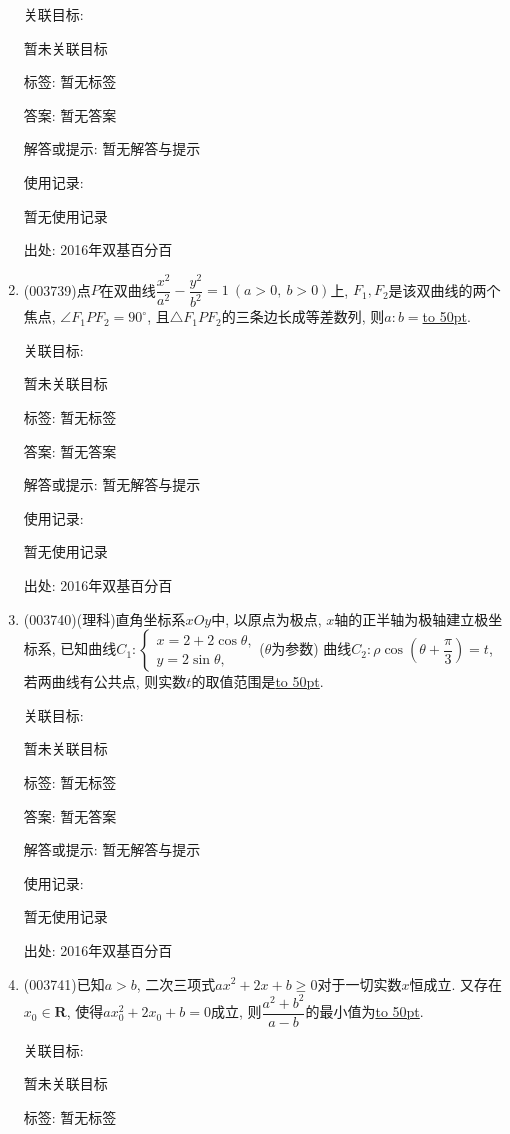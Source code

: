 \documentclass[10pt,a4paper]{article}
\newcommand{\blank}[1]{\underline{\hbox to #1pt{}}}
\begin{document}
\begin{enumerate}[1.]
关联目标:

暂未关联目标



标签: 暂无标签

答案: 暂无答案

解答或提示: 暂无解答与提示

使用记录:

暂无使用记录


出处: 2016年双基百分百
\item { (003739)}点$P$在双曲线$\dfrac{x^2}{a^2}-\dfrac{y^2}{b^2}=1 \ (a>0, \ b>0)$上, $F_1,F_2$是该双曲线的两个焦点, $\angle F_1PF_2=90^\circ$, 且$\triangle F_1PF_2$的三条边长成等差数列, 则$a:b=$\blank{50}.


关联目标:

暂未关联目标



标签: 暂无标签

答案: 暂无答案

解答或提示: 暂无解答与提示

使用记录:

暂无使用记录


出处: 2016年双基百分百
\item { (003740)}(理科)直角坐标系$xOy$中, 以原点为极点, $x$轴的正半轴为极轴建立极坐标系, 已知曲线$C_1: \begin{cases}x=2+2\cos\theta, \\y=2\sin \theta,\end{cases}$($\theta$为参数) 曲线$C_2:\rho\cos\left(\theta+\dfrac{\pi}{3}\right)=t$, 若两曲线有公共点, 则实数$t$的取值范围是\blank{50}.


关联目标:

暂未关联目标



标签: 暂无标签

答案: 暂无答案

解答或提示: 暂无解答与提示

使用记录:

暂无使用记录


出处: 2016年双基百分百
\item { (003741)}已知$a>b$, 二次三项式$ax^2+2x+b\ge 0$对于一切实数$x$恒成立. 又存在$x_0\in \mathbf{R}$, 使得$ax_0^2+2x_0+b=0$成立, 则$\dfrac{a^2+b^2}{a-b}$的最小值为\blank{50}.


关联目标:

暂未关联目标



标签: 暂无标签


\end{enumerate}
\end{document}
